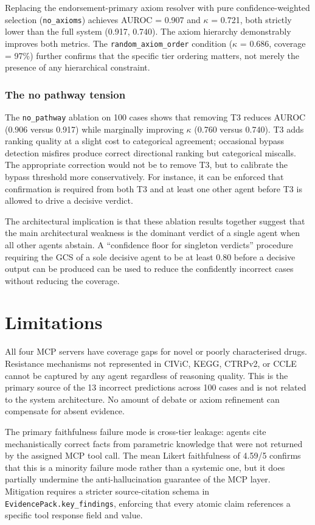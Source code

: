 \documentclass{article}
\begin{document}
Replacing the endorsement-primary axiom resolver with pure confidence-weighted selection (\texttt{no\_axioms}) achieves AUROC = 0.907 and $\kappa$ = 0.721, both strictly lower than the full system (0.917, 0.740). The axiom hierarchy demonstrably improves both metrics. The \texttt{random\_axiom\_order} condition ($\kappa$ = 0.686, coverage = 97\%) further confirms that the specific tier ordering matters, not merely the presence of any hierarchical constraint.

\subsubsection{The no pathway tension}

The \texttt{no\_pathway} ablation on 100 cases shows that removing T3 reduces AUROC (0.906 versus 0.917) while marginally improving $\kappa$ (0.760 versus 0.740). T3 adds ranking quality at a slight cost to categorical agreement; occasional bypass detection misfires produce correct directional ranking but categorical miscalls. The appropriate correction would not be to remove T3, but to calibrate the bypass threshold more conservatively. For instance, it can be enforced that confirmation is required from both T3 and at least one other agent before T3 is allowed to drive a decisive verdict. 

The architectural implication is that these ablation results together suggest that the main architectural weakness is the dominant verdict of a single agent when all other agents abstain. A ``confidence floor for singleton verdicts'' procedure requiring the GCS of a sole decisive agent to be at least 0.80 before a decisive output can be produced can be used to reduce the confidently incorrect cases without reducing the coverage.  

\section{Limitations}
\label{sec:limitations}

All four MCP servers have coverage gaps for novel or poorly characterised drugs. Resistance mechanisms not represented in CIViC, KEGG, CTRPv2, or CCLE cannot be captured by any agent regardless of reasoning quality. This is the primary source of the 13 incorrect predictions across 100 cases and is not related to the system architecture. No amount of debate or axiom refinement can compensate for absent evidence.

The primary faithfulness failure mode is cross-tier leakage: agents cite mechanistically correct facts from parametric knowledge that were not returned by the assigned MCP tool call. The mean Likert faithfulness of 4.59/5 confirms that this is a minority failure mode rather than a systemic one, but it does partially undermine the anti-hallucination guarantee of the MCP layer. Mitigation requires a stricter source-citation schema in \texttt{EvidencePack.key\_findings}, enforcing that every atomic claim references a specific tool response field and value.
\end{document}
